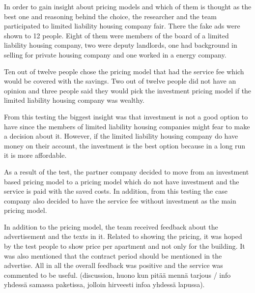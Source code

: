 In order to gain insight about pricing models and which of them is thought as the best one and reasoning behind the choice, the researcher and the team participated to limited liability housing company fair. There the fake ads were shown to 12 people. Eight of them were members of the board of a limited liability housing company, two were deputy landlords, one had background in selling for private housing company and one worked in a energy company.

Ten out of twelve people chose the pricing model that had the service fee which would be covered with the savings. Two out of twelve people did not have an opinion and three people said they would pick the investment pricing model if the limited liability housing company was wealthy.

From this testing the biggest insight was that investment is not a good option to have since the members of limited liability housing companies might fear to make a decision about it. However, if the limited liability housing company do have money on their account, the investment is the best option because in a long run it is more affordable.

As a result of the test, the partner company decided to move from an investment based pricing model to a pricing model which do not have investment and the service is paid with the saved costs. In addition, from this testing the case company also decided to have the service fee without investment as the main pricing model.

In addition to the pricing model, the team received feedback about the advertisement and the texts in it. Related to showing the pricing, it was hoped by the test people to show price per apartment and not only for the building. It was also mentioned that the contract period should be mentioned in the advertise. All in all the overall feedback was positive and the service was commented to be useful.
(discussion, huono kun pitää mennä tarjous / info yhdessä samassa paketissa, jolloin hirveesti infoa yhdessä lapussa).



